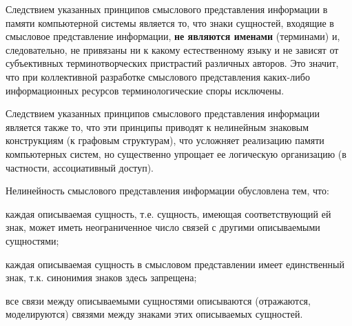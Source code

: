 \begin{SCn}
{Следствием указанных принципов смыслового представления информации в памяти компьютерной системы является то, что знаки сущностей, входящие в смысловое представление информации, \textbf{не являются именами} (терминами) и, следовательно, не привязаны ни к какому естественному языку и не зависят от субъективных терминотворческих пристрастий различных авторов. Это значит, что при коллективной разработке смыслового представления каких-либо информационных ресурсов терминологические споры исключены.

Следствием указанных принципов смыслового представления информации  является также то, что эти принципы приводят к нелинейным знаковым конструкциям (к графовым структурам), что усложняет реализацию памяти компьютерных систем, но существенно упрощает ее логическую организацию (в частности, ассоциативный доступ).

Нелинейность смыслового представления информации обусловлена тем, что: 
\begin{scnitemize}
    \item каждая описываемая сущность, т.е. сущность, имеющая соответствующий ей знак, может иметь неограниченное число связей с другими описываемыми сущностями;
    \item каждая описываемая сущность в смысловом представлении имеет единственный знак, т.к. синонимия знаков здесь запрещена;
    \item все связи между описываемыми сущностями описываются (отражаются, моделируются) связями между знаками этих описываемых сущностей.
\end{scnitemize}

}
\end{SCn}
